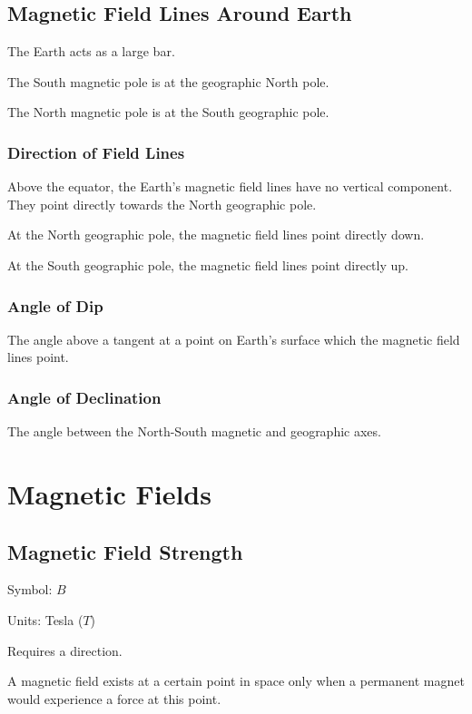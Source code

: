\documentclass[a4paper,11pt]{article}
\begin{document}
\subsection{Magnetic Field Lines Around Earth}

The Earth acts as a large bar.

The South magnetic pole is at the geographic North pole.

The North magnetic pole is at the South geographic pole.


\subsubsection{Direction of Field Lines}

Above the equator, the Earth's magnetic field lines have no vertical component.
They point directly towards the North geographic pole.

At the North geographic pole, the magnetic field lines point directly down.

At the South geographic pole, the magnetic field lines point directly up.


\subsubsection{Angle of Dip}

The angle above a tangent at a point on Earth's surface which the magnetic
field lines point.


\subsubsection{Angle of Declination}

The angle between the North-South magnetic and geographic axes.




\section{Magnetic Fields}

\subsection{Magnetic Field Strength}

Symbol: $B$

Units: Tesla ($T$)

Requires a direction.

A magnetic field exists at a certain point in space only when a permanent
magnet would experience a force at this point.
\end{document}
